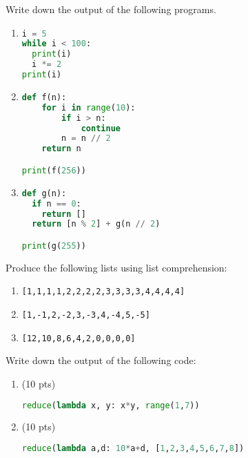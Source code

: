 \documentclass[addpoints,12pt]{exam}
\newcommand{\code}[1]{{\texttt{#1}}}
\begin{document}
\begin{questions}

\question[20]
Write down the output of the following programs.

\begin{enumerate}
  \item 
\begin{lstlisting}[language=python]
i = 5 
while i < 100:
  print(i)
  i *= 2 
print(i)
\end{lstlisting}
    \vfill

\item 
\begin{lstlisting}[language=python]
def f(n):
    for i in range(10):
        if i > n:
            continue
        n = n // 2
    return n

print(f(256))
\end{lstlisting}

    \vfill

  \item 
\begin{lstlisting}[language=python]
def g(n):
  if n == 0:
    return [] 
  return [n % 2] + g(n // 2) 

print(g(255))
\end{lstlisting}

    \vfill
\end{enumerate}

\newpage
\question[20] Produce the following lists using list comprehension:
\begin{enumerate}
  \item \code{[1,1,1,1,2,2,2,2,3,3,3,3,4,4,4,4]}
    \vfill
  \item \code{[1,-1,2,-2,3,-3,4,-4,5,-5]}
    \vfill
  \item \code{[12,10,8,6,4,2,0,0,0,0]}
    \vfill
\end{enumerate}

\newpage
\question[20] Write down the output of the following code:

\begin{enumerate}
  \item (10 pts) 
\begin{lstlisting}[language=python]
reduce(lambda x, y: x*y, range(1,7))
\end{lstlisting}
\vfill
  \item (10 pts)
    \begin{lstlisting}[language=python] 
reduce(lambda a,d: 10*a+d, [1,2,3,4,5,6,7,8])
\end{lstlisting}
\vfill


\end{enumerate}
\end{questions}
\end{document}
